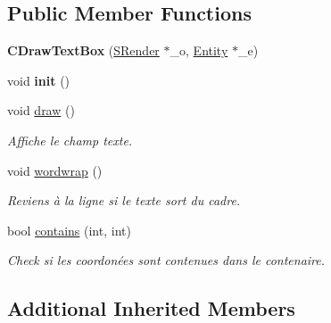 \subsection*{Public Member Functions}
\begin{DoxyCompactItemize}
\item 
\hypertarget{class_c_draw_text_box_aa2ba5a234bcd4e63bf7fbe7b10abd914}{}{\bfseries C\+Draw\+Text\+Box} (\hyperlink{class_s_render}{S\+Render} $\ast$\+\_\+o, \hyperlink{class_entity}{Entity} $\ast$\+\_\+e)\label{class_c_draw_text_box_aa2ba5a234bcd4e63bf7fbe7b10abd914}

\item 
\hypertarget{class_c_draw_text_box_acee17be5f109c79811e87e11c4281268}{}void {\bfseries init} ()\label{class_c_draw_text_box_acee17be5f109c79811e87e11c4281268}

\item 
\hypertarget{class_c_draw_text_box_a5e530639ce103a15abc92404b057e36f}{}void \hyperlink{class_c_draw_text_box_a5e530639ce103a15abc92404b057e36f}{draw} ()\label{class_c_draw_text_box_a5e530639ce103a15abc92404b057e36f}

\begin{DoxyCompactList}\small\item\em Affiche le champ texte. \end{DoxyCompactList}\item 
\hypertarget{class_c_draw_text_box_a8977b4095864ed28eaac326f8095e14e}{}void \hyperlink{class_c_draw_text_box_a8977b4095864ed28eaac326f8095e14e}{wordwrap} ()\label{class_c_draw_text_box_a8977b4095864ed28eaac326f8095e14e}

\begin{DoxyCompactList}\small\item\em Reviens à la ligne si le texte sort du cadre. \end{DoxyCompactList}\item 
\hypertarget{class_c_draw_text_box_a739e94ce36ce2c615806c3cdc8efe29d}{}bool \hyperlink{class_c_draw_text_box_a739e94ce36ce2c615806c3cdc8efe29d}{contains} (int, int)\label{class_c_draw_text_box_a739e94ce36ce2c615806c3cdc8efe29d}

\begin{DoxyCompactList}\small\item\em Check si les coordonées sont contenues dans le contenaire. \end{DoxyCompactList}\end{DoxyCompactItemize}
\subsection*{Additional Inherited Members}


